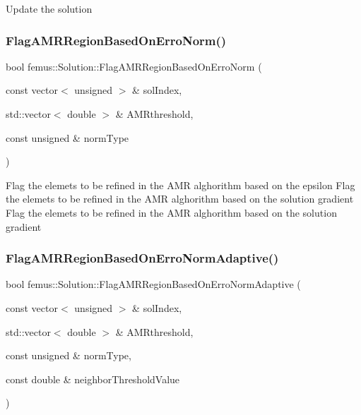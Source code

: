 Update the solution \mbox{\label{classfemus_1_1_solution_a875fb4f174e5e08e6501682a62da7c18}} 
\subsubsection{\texorpdfstring{Flag\+A\+M\+R\+Region\+Based\+On\+Erro\+Norm()}{FlagAMRRegionBasedOnErroNorm()}}
{\footnotesize\ttfamily bool femus\+::\+Solution\+::\+Flag\+A\+M\+R\+Region\+Based\+On\+Erro\+Norm (\begin{DoxyParamCaption}\item[{const vector$<$ unsigned $>$ \&}]{sol\+Index,  }\item[{std\+::vector$<$ double $>$ \&}]{A\+M\+Rthreshold,  }\item[{const unsigned \&}]{norm\+Type }\end{DoxyParamCaption})}

Flag the elemets to be refined in the A\+MR alghorithm based on the epsilon Flag the elemets to be refined in the A\+MR alghorithm based on the solution gradient Flag the elemets to be refined in the A\+MR alghorithm based on the solution gradient \mbox{\label{classfemus_1_1_solution_a1cdfede6ad6f2c5955cee4fb79509a2d}} 
\subsubsection{\texorpdfstring{Flag\+A\+M\+R\+Region\+Based\+On\+Erro\+Norm\+Adaptive()}{FlagAMRRegionBasedOnErroNormAdaptive()}}
{\footnotesize\ttfamily bool femus\+::\+Solution\+::\+Flag\+A\+M\+R\+Region\+Based\+On\+Erro\+Norm\+Adaptive (\begin{DoxyParamCaption}\item[{const vector$<$ unsigned $>$ \&}]{sol\+Index,  }\item[{std\+::vector$<$ double $>$ \&}]{A\+M\+Rthreshold,  }\item[{const unsigned \&}]{norm\+Type,  }\item[{const double \&}]{neighbor\+Threshold\+Value }\end{DoxyParamCaption})}

